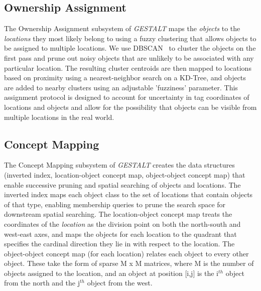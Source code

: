 \subsection{Ownership Assignment}
The Ownership Assignment subsystem of \emph{GESTALT} maps the \textit{objects} to the \textit{locations} they most likely belong to using a fuzzy clustering that allows objects to be assigned to multiple locations. 
We use DBSCAN~\cite{DBSCAN} to cluster the objects on the first pass and prune out noisy objects that are unlikely to be associated with any particular location. %
The resulting cluster centroids are then mapped to locations based on proximity using a nearest-neighbor search on a KD-Tree, and objects are added to nearby clusters using an adjustable 'fuzziness' parameter.
This assignment protocol is designed to account for uncertainty in tag coordinates of locations and objects and allow for the possibility that objects can be visible from multiple locations in the real world.


\subsection{Concept Mapping}
The Concept Mapping subsystem of \emph{GESTALT} creates the data structures (inverted index, location-object concept map, object-object concept map) that enable successive pruning and spatial searching of objects and locations. 
The inverted index maps each object class to the set of locations that contain objects of that type, enabling membership queries to prune the search space for downstream spatial searching. 
The location-object concept map treats the coordinates of the \textit{location} as the division point on both the north-south and west-east axes, and maps the objects for each location to the quadrant that specifies the cardinal direction they lie in with respect to the location.%
The object-object concept map (for each location) relates each object to every other object. These take the form of sparse M x M matrices, where M is the number of objects assigned to the location, and an object at position [i,j] is the i$^{th}$ object from the north and the j$^{th}$ object from the west. 

